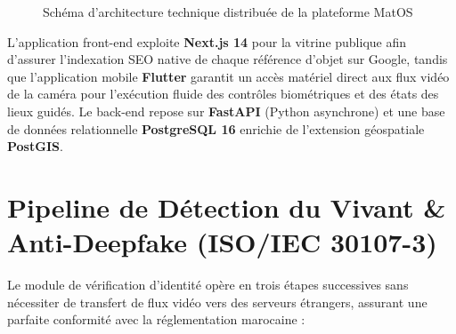 \documentclass[11pt,a4paper]{report}
\begin{document}
\begin{figure}[h!]
\caption{Schéma d'architecture technique distribuée de la plateforme MatOS}
\end{figure}

L'application front-end exploite \textbf{Next.js 14} pour la vitrine publique afin d'assurer l'indexation SEO native de chaque référence d'objet sur Google, tandis que l'application mobile \textbf{Flutter} garantit un accès matériel direct aux flux vidéo de la caméra pour l'exécution fluide des contrôles biométriques et des états des lieux guidés. Le back-end repose sur \textbf{FastAPI} (Python asynchrone) et une base de données relationnelle \textbf{PostgreSQL 16} enrichie de l'extension géospatiale \textbf{PostGIS}.

\section{Pipeline de Détection du Vivant \& Anti-Deepfake (ISO/IEC 30107-3)}
Le module de vérification d'identité opère en trois étapes successives sans nécessiter de transfert de flux vidéo vers des serveurs étrangers, assurant une parfaite conformité avec la réglementation marocaine :
\end{document}
